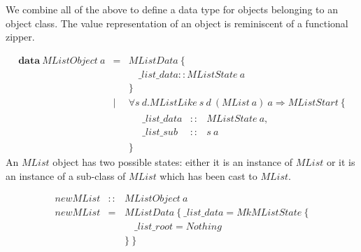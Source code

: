 \documentclass[runningheads,a4paper]{llncs}
\begin{document}
We combine all of the above to define a data type for objects belonging to an object class. The value representation of an object is reminiscent of a functional zipper.

\begin{displaymath}
\begin{array}{lcl}
\mathbf{data}~\mathit{MListObject}~a & = & \mathit{MListData}~\{ \\ 
 & & \quad \_\mathit{list}\_\mathit{data} :: \mathit{MListState}~a\\
 & & \} \\
 & \mid & \forall s~d.\mathit{MListLike}~s~d~(\mathit{MList}~a)~a \Rightarrow \mathit{MListStart}~\{\\
 & & \quad \begin{array}{lcl}
 \_\mathit{list}\_\mathit{data} & :: & \mathit{MListState}~a, \\
 \_\mathit{list}\_\mathit{sub}  & :: & s~a
 \end{array}\\
 & & \}
\end{array}
\end{displaymath}
An $\mathit{MList}$ object has two possible states: either it is an instance of $\mathit{MList}$ or it is an instance of a sub-class of $\mathit{MList}$ which has been cast to $\mathit{MList}$.

\begin{displaymath}
\begin{array}{lcl}
\mathit{newMList} & :: & \mathit{MListObject}~a \\
\mathit{newMList} & = & \mathit{MListData}~\{~\_\mathit{list}\_\mathit{data} = \mathit{MkMListState}~\{\\ 
&& \quad \_\mathit{list}\_\mathit{root} = \mathit{Nothing}\\
&& \}~\}
\end{array}
\end{displaymath}
\end{document}
